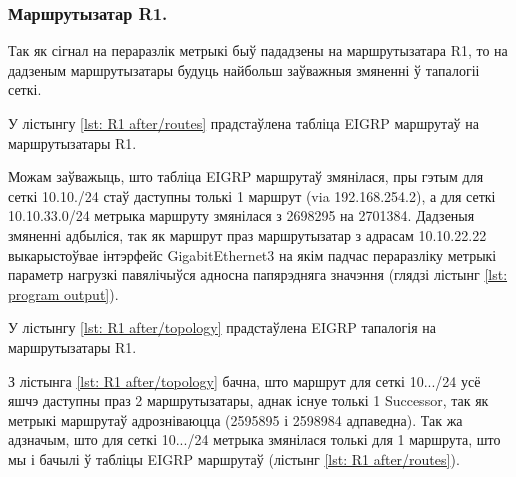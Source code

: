 \subsubsection{Маршрутызатар R1.}

Так як сігнал на пераразлік метрыкі быў пададзены на маршрутызатара R1, то на дадзеным
маршрутызатары будуць найбольш заўважныя змяненні ў тапалогіі сеткі.

У лістынгу \ref{lst: R1 after/routes} прадстаўлена табліца EIGRP маршрутаў на маршрутызатары R1.



Можам заўважыць, што табліца EIGRP маршрутаў змянілася, пры гэтым
для сеткі 10.10./24 стаў даступны толькі 1 маршрут (via 192.168.254.2), а для сеткі 10.10.33.0/24 метрыка маршруту змянілася з 2698295 на 2701384.
Дадзеныя змяненні адбыліся, так як маршрут праз маршрутызатар з адрасам
10.10.22.22 выкарыстоўвае інтэрфейс GigabitEthernet3 на якім падчас пераразліку
метрыкі параметр нагрузкі павялічыўся адносна папярэдняга значэння (глядзі лістынг \ref{lst: program output}).

У лістынгу \ref{lst: R1 after/topology} прадстаўлена EIGRP тапалогія
на маршрутызатары R1.



З лістынга \ref{lst: R1 after/topology} бачна, што маршрут для сеткі
10.../24 усё яшчэ даступны праз 2 маршрутызатары,
аднак існуе толькі 1 Successor, так як метрыкі маршрутаў адрозніваюцца
(2595895 і 2598984 адпаведна). Так жа адзначым, што для сеткі
10.../24 метрыка змянілася толькі для 1 маршрута, што
мы і бачылі ў табліцы EIGRP маршрутаў (лістынг \ref{lst: R1 after/routes}).
